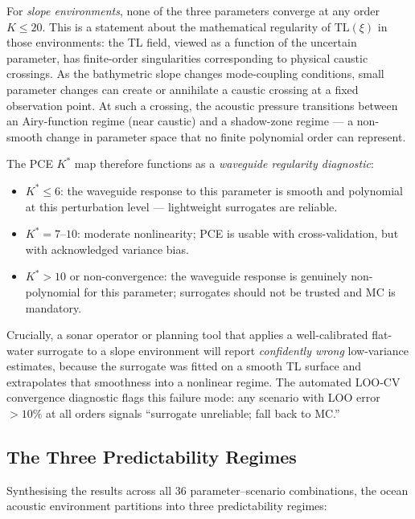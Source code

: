 \documentclass[11pt,a4paper]{article}
\begin{document}
For \emph{slope environments}, none of the three parameters converge at any order
$K \leq 20$.
This is a statement about the mathematical regularity of $\mathrm{TL}(\xi)$ in those
environments:
the TL field, viewed as a function of the uncertain parameter, has finite-order singularities
corresponding to physical caustic crossings.
As the bathymetric slope changes mode-coupling conditions, small parameter changes
can create or annihilate a caustic crossing at a fixed observation point.
At such a crossing, the acoustic pressure transitions between an Airy-function regime
(near caustic) and a shadow-zone regime --- a non-smooth change in parameter space that
no finite polynomial order can represent.

The PCE $K^*$ map therefore functions as a \emph{waveguide regularity diagnostic}:
\begin{itemize}
  \item $K^* \leq 6$: the waveguide response to this parameter is smooth and polynomial
        at this perturbation level --- lightweight surrogates are reliable.
  \item $K^* = 7$--$10$: moderate nonlinearity; PCE is usable with cross-validation,
        but with acknowledged variance bias.
  \item $K^* > 10$ or non-convergence: the waveguide response is genuinely
        non-polynomial for this parameter; surrogates should not be trusted and MC is
        mandatory.
\end{itemize}

Crucially, a sonar operator or planning tool that applies a well-calibrated flat-water
surrogate to a slope environment will report \emph{confidently wrong} low-variance
estimates, because the surrogate was fitted on a smooth TL surface and extrapolates
that smoothness into a nonlinear regime.
The automated LOO-CV convergence diagnostic flags this failure mode: any scenario
with LOO error $> 10\%$ at all orders signals ``surrogate unreliable; fall back to MC.''

\subsection{The Three Predictability Regimes}
\label{sec:three_regimes}

Synthesising the results across all 36 parameter--scenario combinations, the ocean
acoustic environment partitions into three predictability regimes:
\end{document}
